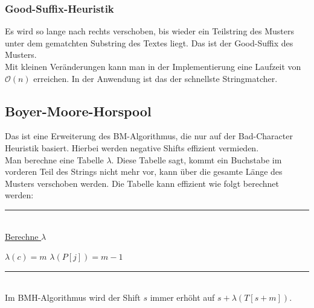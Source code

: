 \documentclass[a4paper, 12pt]{article}
\begin{document}
	\subsubsection{Good-Suffix-Heuristik}
	Es wird so lange nach rechts verschoben, bis wieder ein Teilstring des Musters unter dem gematchten Substring des Textes liegt. Das ist der Good-Suffix des Musters.\\
	Mit kleinen Veränderungen kann man in der Implementierung eine Laufzeit von $\mathcal{O}(n)$ erreichen. In der Anwendung ist das der schnellste Stringmatcher.
	\subsection{Boyer-Moore-Horspool}
	Das ist eine Erweiterung des BM-Algorithmus, die nur auf der Bad-Character Heuristik basiert. Hierbei werden negative Shifts effizient vermieden.\\
	Man berechne eine Tabelle $\lambda$. Diese Tabelle sagt, kommt ein Buchstabe im vorderen Teil des Strings nicht mehr vor, kann über die gesamte Länge des Musters verschoben werden. Die Tabelle kann effizient wie folgt berechnet werden:
	\par\noindent\rule{\textwidth}{0.4pt}\\
	\underline{Berechne $\lambda$}
	\begin{algorithmic}[1]
		\State $\lambda(c) = m$
		\EndFor
		\State $\lambda(P[j]) = m-1$
		\EndFor
	\end{algorithmic}
	\par\noindent\rule{\textwidth}{0.4pt}\\
	Im BMH-Algorithmus wird der Shift $s$ immer erhöht auf $s+\lambda(T[s+m])$.
\end{document}
